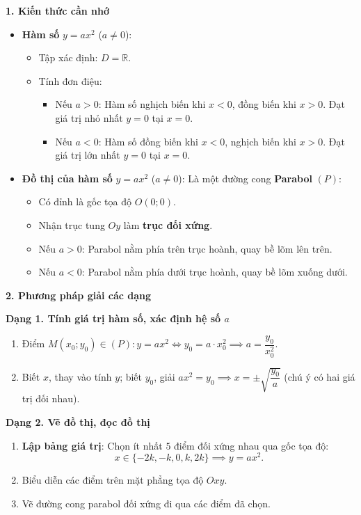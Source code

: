\textbf{1. Kiến thức cần nhớ}
\begin{itemize}
\item \textbf{Hàm số} $y = ax^2$ ($a \ne 0$):
\begin{itemize}
\item Tập xác định: $D = \mathbb{R}$.
\item Tính đơn điệu:
\begin{itemize}
\item Nếu $a > 0$: Hàm số nghịch biến khi $x < 0$, đồng biến khi $x > 0$. Đạt giá trị nhỏ nhất $y = 0$ tại $x = 0$.
\item Nếu $a < 0$: Hàm số đồng biến khi $x < 0$, nghịch biến khi $x > 0$. Đạt giá trị lớn nhất $y = 0$ tại $x = 0$.
\end{itemize}
\end{itemize}
\item \textbf{Đồ thị của hàm số} $y = ax^2$ ($a \ne 0$): Là một đường cong \textbf{Parabol} $(P)$:
\begin{itemize}
\item Có đỉnh là gốc tọa độ $O(0; 0)$.
\item Nhận trục tung $Oy$ làm \textbf{trục đối xứng}.
\item Nếu $a > 0$: Parabol nằm phía trên trục hoành, quay bề lõm lên trên.
\item Nếu $a < 0$: Parabol nằm phía dưới trục hoành, quay bề lõm xuống dưới.
\end{itemize}
\end{itemize}

\textbf{2. Phương pháp giải các dạng}

\textbf{Dạng 1. Tính giá trị hàm số, xác định hệ số $a$}
\begin{enumerate}
\item Điểm $M(x_0; y_0) \in (P)\colon y = ax^2 \iff y_0 = a \cdot x_0^2 \implies \boxed{a = \dfrac{y_0}{x_0^2}}$.
\item Biết $x$, thay vào tính $y$; biết $y_0$, giải $ax^2 = y_0 \implies x = \pm\sqrt{\dfrac{y_0}{a}}$ (chú ý có hai giá trị đối nhau).
\end{enumerate}

\textbf{Dạng 2. Vẽ đồ thị, đọc đồ thị}
\begin{enumerate}
\item \textbf{Lập bảng giá trị}: Chọn ít nhất $5$ điểm đối xứng nhau qua gốc tọa độ:
$$x \in \{-2k, -k, 0, k, 2k\} \implies y = ax^2.$$
\item Biểu diễn các điểm trên mặt phẳng tọa độ $Oxy$.
\item Vẽ đường cong parabol đối xứng đi qua các điểm đã chọn.
\end{enumerate}

